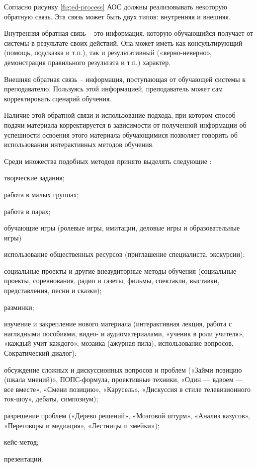 Согласно рисунку \ref{fig:ed-process} АОС должны реализовывать некоторую обратную связь. Эта связь может быть двух типов: внутренняя и внешняя.

Внутренняя обратная связь – это информация, которую обучающийся получает от системы в результате своих действий. Она может иметь как консультирующий (помощь, подсказка и т.п.), так и результативный («верно-неверно», демонстрация правильного результата и т.п.) характер.

Внешняя обратная связь – информация, поступающая от обучающей системы к преподавателю. Пользуясь этой информацией, преподаватель может сам корректировать сценарий обучения.

Наличие этой обратной связи и использование подхода, при котором способ подачи материала корректируется в зависимости от полученной информации об успешности освоения этого материала обучающимися позволяет говорить об использовании интерактивных методов обучения.

Среди множества подобных методов принято выделять следующие \cite{Cholak}:
\begin{itemize*}
\item творческие задания;
\item работа в малых группах;
\item работа в парах;
\item обучающие игры (ролевые игры, имитации, деловые игры и образовательные игры)
\item использование общественных ресурсов (приглашение специалиста, экскурсии);
\item социальные проекты и другие внеаудиторные методы обучения (социальные проекты, соревнования, радио и газеты, фильмы, спектакли, выставки, представления, песни и сказки);
\item разминки;
\item изучение и закрепление нового материала (интерактивная лекция, работа с наглядными пособиями, видео- и аудиоматериалами, «ученик в роли учителя», «каждый учит каждого», мозаика (ажурная пила), использование вопросов, Сократический диалог);
\item обсуждение сложных и дискуссионных вопросов и проблем («Займи позицию (шкала мнений)», ПОПС-формула, проективные техники, «Один — вдвоем — все вместе», «Смени позицию», «Карусель», «Дискуссия в стиле телевизионного ток-шоу», дебаты, симпозиум);
\item разрешение проблем («Дерево решений», «Мозговой штурм», «Анализ казусов», «Переговоры и медиация», «Лестницы и змейки»);
\item кейс-метод;
\item презентации.
\end{itemize*}

